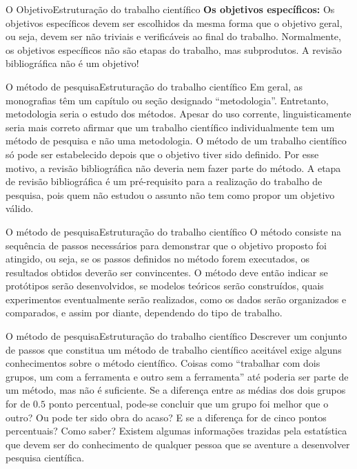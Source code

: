 \documentclass[t]{beamer}
\begin{document}

\begin{ftst}{O Objetivo}{Estruturação do trabalho científico}
\justifying
\textbf{Os objetivos específicos:}
\vone
Os objetivos específicos devem ser escolhidos da mesma forma que o objetivo geral, ou seja, devem ser não triviais e verificáveis ao final do trabalho. Normalmente, os objetivos específicos não são etapas do trabalho, mas subprodutos. 
\vone
A revisão bibliográfica não é um objetivo!

\end{ftst}


\begin{ftst}{O método de pesquisa}{Estruturação do trabalho científico}
\justifying
Em geral, as monografias têm um capítulo ou seção designado “metodologia”. Entretanto, metodologia seria o estudo dos métodos. Apesar do uso corrente, linguisticamente seria mais correto afirmar que um trabalho científico individualmente tem um método de pesquisa e não uma metodologia. 
\vone
O método de um trabalho científico só pode ser estabelecido depois que o objetivo tiver sido definido. Por esse motivo, a revisão bibliográfica não deveria nem fazer parte do método.
\vone
A etapa de revisão bibliográfica é um pré-requisito para a realização do trabalho de pesquisa, pois quem não estudou o assunto não tem como propor um objetivo válido.

\end{ftst}


\begin{ftst}{O método de pesquisa}{Estruturação do trabalho científico}
\justifying
O método consiste na sequência de passos necessários para demonstrar que o objetivo proposto foi atingido, ou seja, se os passos definidos no método forem executados, os resultados obtidos deverão ser convincentes.
\vone
O método deve então indicar se protótipos serão desenvolvidos, se modelos teóricos serão construídos, quais experimentos eventualmente serão realizados, como os dados serão organizados
e comparados, e assim por diante, dependendo do tipo de trabalho.


\end{ftst}


\begin{ftst}{O método de pesquisa}{Estruturação do trabalho científico}
\justifying
Descrever um conjunto de passos que constitua um método de trabalho científico aceitável exige alguns conhecimentos sobre o método científico.
\vone
Coisas como “trabalhar com dois grupos, um com a ferramenta e outro sem a ferramenta” até poderia
ser parte de um método, mas não é suficiente. 
\vone
Se a diferença entre as médias dos dois grupos for de $0.5$ ponto percentual, pode-se concluir que um grupo foi melhor que o outro? Ou pode ter sido obra do acaso? E se a diferença for de cinco pontos percentuais?
\vone
Como saber? Existem algumas informações trazidas pela estatística que devem ser do conhecimento de qualquer pessoa que se aventure a desenvolver pesquisa científica.

\end{ftst}
\end{document}
